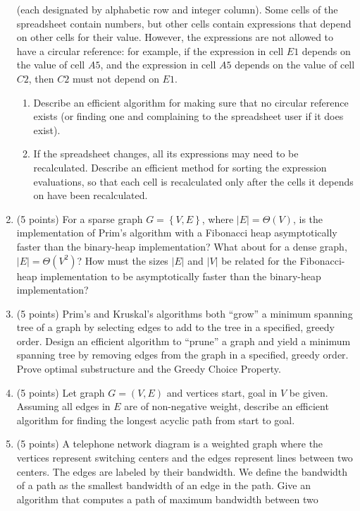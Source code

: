 \documentclass[7]{cs430homework}
\begin{document}
\begin{enumerate}[label=\arabic*.]
	(each designated by alphabetic row and integer column).
	Some cells of the spreadsheet contain numbers,
	but other cells contain expressions that depend on other cells for their value.
	However, the expressions are not allowed to have a circular reference: for example,
	if the expression in cell $E1$ depends on the value of cell $A5$,
	and the expression in cell $A5$ depends on the value of cell $C2$, then $C2$ must not depend on $E1$.
	\begin{enumerate}[label=\arabic{enumi}\alph*)]
		\item Describe an efficient algorithm for making sure that no circular reference exists
		(or finding one and complaining to the spreadsheet user if it does exist).
		\item If the spreadsheet changes, all its expressions may need to be recalculated.
		Describe an efficient method for sorting the expression evaluations,
		so that each cell is recalculated only after the cells it depends on have been recalculated.
	\end{enumerate}
	\item (5 points) For a sparse graph $G=\left\{V,E\right\}$, where $|E|=\Theta(V)$,
	is the implementation of Prim’s algorithm with a Fibonacci heap
	asymptotically faster than the binary-heap implementation?
	What about for a dense graph, $|E|=\Theta(V^{2})$?
	How must the sizes $|E|$ and $|V|$ be related for the Fibonacci-heap
	implementation to be asymptotically faster than the binary-heap implementation?
	\item (5 points) Prim’s and Kruskal’s algorithms both ``grow'' a minimum spanning tree
	of a graph by selecting edges to add to the tree in a specified, greedy order.
	Design an efficient algorithm to ``prune'' a graph and yield a minimum spanning tree
	by removing edges from the graph in a specified, greedy order.
	Prove optimal substructure and the Greedy Choice Property.
	\item (5 points) Let graph $G=\left(V,E\right)$ and vertices start, goal in $V$ be given.
	Assuming all edges in $E$ are of non-negative weight,
	describe an efficient algorithm for finding the longest acyclic path from start to goal.
	\item (5 points) A telephone network diagram is a weighted graph where the vertices
	represent switching centers and the edges represent lines between two centers.
	The edges are labeled by their bandwidth.
	We define the bandwidth of a path as the smallest bandwidth of an edge in the path.
	Give an algorithm that computes a path of maximum bandwidth between two

\end{enumerate}
\end{document}
